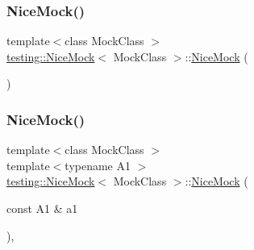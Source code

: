 \subsubsection{\texorpdfstring{NiceMock()}{NiceMock()}\hspace{0.1cm}{\footnotesize\ttfamily [7/17]}}
{\footnotesize\ttfamily template$<$class Mock\+Class $>$ \\
\mbox{\hyperlink{classtesting_1_1_nice_mock}{testing\+::\+Nice\+Mock}}$<$ Mock\+Class $>$\+::\mbox{\hyperlink{classtesting_1_1_nice_mock}{Nice\+Mock}} (\begin{DoxyParamCaption}{ }\end{DoxyParamCaption})\hspace{0.3cm}{\ttfamily [inline]}}

\mbox{\label{classtesting_1_1_nice_mock_a2d6b9cb9d929d1af4532b69c7ef19df6}} 
\subsubsection{\texorpdfstring{NiceMock()}{NiceMock()}\hspace{0.1cm}{\footnotesize\ttfamily [8/17]}}
{\footnotesize\ttfamily template$<$class Mock\+Class $>$ \\
template$<$typename A1 $>$ \\
\mbox{\hyperlink{classtesting_1_1_nice_mock}{testing\+::\+Nice\+Mock}}$<$ Mock\+Class $>$\+::\mbox{\hyperlink{classtesting_1_1_nice_mock}{Nice\+Mock}} (\begin{DoxyParamCaption}\item[{const A1 \&}]{a1 }\end{DoxyParamCaption})\hspace{0.3cm}{\ttfamily [inline]}, {\ttfamily [explicit]}}

\mbox{\label{classtesting_1_1_nice_mock_a150837476e88f52772c8f85180b889a1}} 
